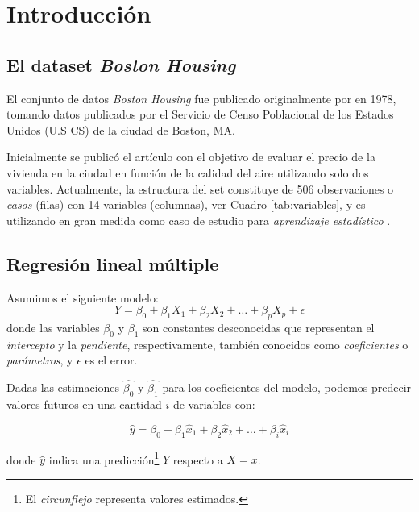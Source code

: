 \documentclass[11pt, letterpaper]{article}
\begin{document}
\tableofcontents\newpage

\section{Introducción}
\subsection{El dataset \textit{Boston Housing}}
El conjunto de datos \textit{Boston Housing} fue publicado originalmente por \textcite{Harrison1978} en 1978, tomando datos publicados por el Servicio de Censo Poblacional de los Estados Unidos (U.S CS) de la ciudad de Boston, MA. 

Inicialmente se publicó el artículo con el objetivo de evaluar el precio de la vivienda en la ciudad en función de la calidad del aire utilizando solo dos variables. Actualmente, la estructura del set constituye de 506 observaciones o \textit{casos} (filas) con 14 variables (columnas), ver Cuadro \ref{tab:variables}, y es utilizando en gran medida como caso de estudio para \textit{aprendizaje estadístico} \cite{al2018comparative, shahhosseini2019optimizing, lin2008particle, ryffel2018generic, timofeev2004classification}.


\subsection{Regresión lineal múltiple}
Asumimos el  siguiente modelo:
\begin{equation}
    Y = \beta_0 + \beta_1 X_1 + \beta_2 X_2 + \ldots + \beta_p X_p + \epsilon
\end{equation}
donde las variables $\beta_0$ y $\beta_1$ son constantes desconocidas que representan el \textit{intercepto} y la \textit{pendiente}, respectivamente, también conocidos como \textit{coeficientes} o \textit{parámetros}, y $\epsilon$ es el error.

Dadas las estimaciones $\hat{\beta_0}$ y $\hat{\beta_1}$ para los coeficientes del modelo, podemos predecir valores futuros en una cantidad $i$ de variables con:

\begin{equation}
    \hat{y} = \beta_0 + \beta_1 \hat{x}_1+ \beta_2 \hat{x}_2 + \ldots + \beta_i \hat{x}_i
\end{equation}

donde $\hat{y}$ indica una predicción\footnote{El \textit{circunflejo} representa valores estimados.} $Y$ respecto a $X=x$.
\end{document}
